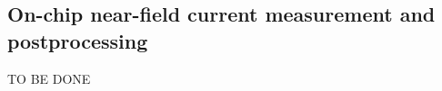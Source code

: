 \subsection{On-chip near-field current measurement and postprocessing}
\label{sec:on-chip-near-field-process}

TO BE DONE
